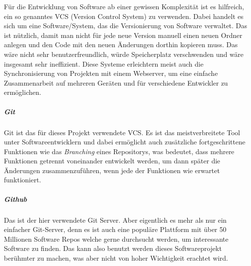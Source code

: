\documentclass[a4paper,11pt]{article}
\begin{document}
Für die Entwicklung von Software ab einer gewissen Komplexität ist es hilfreich, ein so genanntes VCS (Version Control System) zu verwenden. Dabei handelt es sich um eine Software/System, das die Versionierung von Software verwaltet. Das ist nützlich, damit man nicht für jede neue Version manuell einen neuen Ordner anlegen und den Code mit den neuen Änderungen dorthin kopieren muss. Das wäre nicht sehr benutzerfreundlich, würde Speicherplatz verschwenden und wäre insgesamt sehr ineffizient. Diese Systeme erleichtern meist auch die Synchronisierung von Projekten mit einem Webserver, um eine einfache Zusammenarbeit auf mehreren Geräten und für verschiedene Entwickler zu ermöglichen.\\


\subparagraph{Git}
Git ist das für dieses Projekt verwendete VCS. Es ist das meistverbreitete Tool unter Softwareentwicklern und dabei ermöglicht auch zusätzliche fortgeschrittene Funktionen wie das \textit{Branching} eines Repositorys, was bedeutet, dass mehrere Funktionen getrennt voneinander entwickelt werden, um dann später die Änderungen zusammenzuführen, wenn jede der Funktionen wie erwartet funktioniert.\\

\subparagraph{Github}

Das ist der hier verwendete Git Server. Aber eigentlich es mehr als nur ein einfacher Git-Server, denn es ist auch eine populäre Plattform mit über 50 Millionen Software Repos welche gerne durchsucht werden, um interessante Software zu finden. Das kann also benutzt werden dieses Softwareprojekt berühmter zu machen, was aber nicht von hoher Wichtigkeit erachtet wird.
\end{document}
